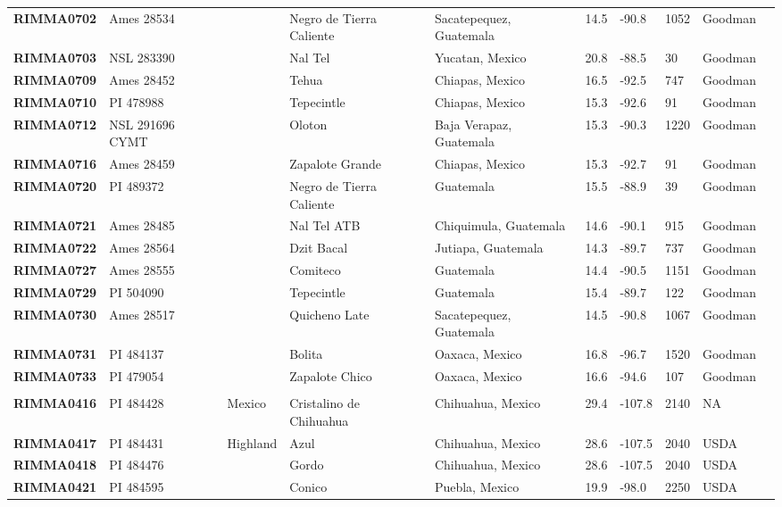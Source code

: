 \documentclass[onecolumn,oneside,letterpaper]{article}
\begin{document}
\begin{table}[h]
\begin{center}
{\begin{tabular}{llllllllll}
{\bf RIMMA0702}	&	Ames 28534	&		&	Negro de Tierra Caliente	&	Sacatepequez, Guatemala	&	14.5 	&	-90.8 	&	1052	&	Goodman	\\
{\bf RIMMA0703}	&	NSL 283390	&		&	Nal Tel	&	Yucatan, Mexico	&	20.8 	&	-88.5 	&	30	&	Goodman	\\
{\bf RIMMA0709}	&	Ames 28452	&		&	Tehua	&	Chiapas, Mexico	&	16.5 	&	-92.5 	&	747	&	Goodman	\\
{\bf RIMMA0710}	&	PI 478988	&		&	Tepecintle	&	Chiapas, Mexico	&	15.3 	&	-92.6 	&	91	&	Goodman	\\
{\bf RIMMA0712}	&	NSL 291696 CYMT	&		&	Oloton	&	Baja Verapaz, Guatemala	&	15.3 	&	-90.3 	&	1220	&	Goodman	\\
{\bf RIMMA0716}	&	Ames 28459	&		&	Zapalote Grande	&	Chiapas, Mexico	&	15.3 	&	-92.7 	&	91	&	Goodman	\\
{\bf RIMMA0720}	&	PI 489372	&		&	Negro de Tierra Caliente	&	Guatemala	&	15.5 	&	-88.9 	&	39	&	Goodman	\\
{\bf RIMMA0721}	&	Ames 28485	&		&	Nal Tel ATB	&	Chiquimula, Guatemala	&	14.6 	&	-90.1 	&	915	&	Goodman	\\
{\bf RIMMA0722}	&	Ames 28564	&		&	Dzit Bacal	&	Jutiapa, Guatemala	&	14.3 	&	-89.7 	&	737	&	Goodman	\\
{\bf RIMMA0727}	&	Ames 28555	&		&	Comiteco	&	Guatemala	&	14.4 	&	-90.5 	&	1151	&	Goodman	\\
{\bf RIMMA0729}	&	PI 504090	&		&	Tepecintle	&	Guatemala	&	15.4 	&	-89.7 	&	122	&	Goodman	\\
{\bf RIMMA0730}	&	Ames 28517	&		&	Quicheno Late	&	Sacatepequez, Guatemala	&	14.5 	&	-90.8 	&	1067	&	Goodman	\\
{\bf RIMMA0731}	&	PI 484137	&		&	Bolita	&	Oaxaca, Mexico	&	16.8 	&	-96.7 	&	1520	&	Goodman	\\
{\bf RIMMA0733}	&	PI 479054	&		&	Zapalote Chico	&	Oaxaca, Mexico	&	16.6 	&	-94.6 	&	107	&	Goodman	\\
	\hline 
	& & & \\[-4mm] 
{\bf RIMMA0416}	&	PI 484428	&	Mexico	&	Cristalino de Chihuahua	&	Chihuahua, Mexico	&	29.4 	&	-107.8 	&	2140	&	NA	\\
{\bf RIMMA0417}	&	PI 484431	&	Highland	&	Azul	&	Chihuahua, Mexico	&	28.6 	&	-107.5 	&	2040	&	USDA	\\
{\bf RIMMA0418}	&	PI 484476	&		&	Gordo	&	Chihuahua, Mexico	&	28.6 	&	-107.5 	&	2040	&	USDA	\\
{\bf RIMMA0421}	&	PI 484595	&		&	Conico	&	Puebla, Mexico	&	19.9 	&	-98.0 	&	2250	&	USDA	\\

\end{tabular}}
\end{center}
\end{table}
\end{document}
